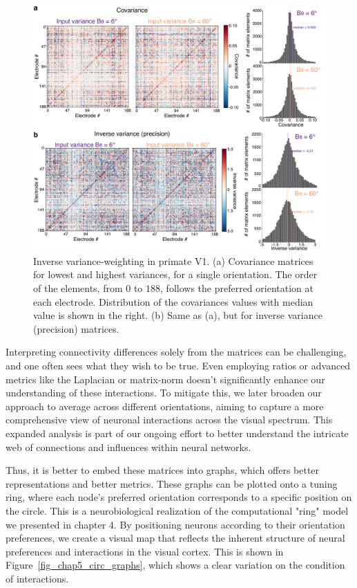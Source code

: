 \begin{figure}[h!tbp]
\vspace{0.1cm}
\centering
\includegraphics[width=1.\textwidth]{fig/chap5_matrices.pdf}
\caption[Covariance matrices in primate V1.]{Inverse variance-weighting in primate \gls{V1}. (a) Covariance matrices for lowest and highest variances, for a single orientation. The order of the elements, from $0$ to $188$, follows the preferred orientation at each electrode. Distribution of the covariances values with median value is shown in the right. (b) Same as (a), but for inverse variance (precision) matrices. }
\label{fig_chap5_matrices} 
\end{figure} 

Interpreting connectivity differences solely from the matrices can be challenging, and one often sees what they wish to be true. Even employing ratios or advanced metrics like the Laplacian or matrix-norm doesn't significantly enhance our understanding of these interactions. To mitigate this, we later broaden our approach to average across different orientations, aiming to capture a more comprehensive view of neuronal interactions across the visual spectrum. This expanded analysis is part of our ongoing effort to better understand the intricate web of connections and influences within neural networks.

Thus, it is better to embed these matrices into graphs, which offers better representations and better metrics. These graphs can be plotted onto a tuning ring, where each node's preferred orientation corresponds to a specific position on the circle. This is a neurobiological realization of the computational "ring" model we presented in chapter 4. By positioning neurons according to their orientation preferences, we create a visual map that reflects the inherent structure of neural preferences and interactions in the visual cortex. This is shown in Figure~\ref{fig_chap5_circ_graphs}, which shows a clear variation on the condition of interactions.

